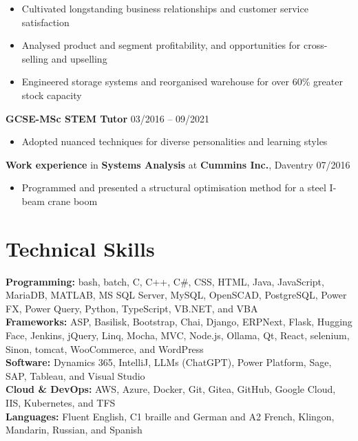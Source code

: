 \documentclass[10pt,a4paper]{article}
\begin{document}
\begin{itemize}[noitemsep]
   \item Cultivated longstanding business relationships and customer service satisfaction
   \item Analysed product and segment profitability, and opportunities for cross-selling and upselling
   \item Engineered storage systems and reorganised warehouse for over 60\% greater stock capacity
\end{itemize}
\textbf{GCSE-MSc STEM Tutor} \hfill 03/2016 -- 09/2021\vspace{-\baselineskip}\medskip
\begin{itemize}[noitemsep]
   \item Adopted nuanced techniques for diverse personalities and learning styles
\end{itemize}
\textbf{Work experience} in \textbf{Systems Analysis} at \textbf{Cummins Inc.}, Daventry \hfill 07/2016\vspace{-\baselineskip}\medskip
\begin{itemize}[noitemsep]
   \item Programmed and presented a structural optimisation method for a steel I-beam crane boom
\end{itemize}

\section*{Technical Skills}\vspace{-\baselineskip}\medskip
\textbf{Programming:} bash, batch, C, C++, C\#, CSS, HTML, Java, JavaScript, MariaDB, MATLAB, MS SQL Server, MySQL, OpenSCAD, PostgreSQL, Power FX, Power Query, Python, TypeScript, VB.NET, and VBA\smallskip\\
\textbf{Frameworks:} ASP, Basilisk, Bootstrap, Chai, Django, ERPNext, Flask, Hugging Face, Jenkins, jQuery, Linq, Mocha, MVC, Node.js, Ollama, Qt, React, selenium, Sinon, tomcat, WooCommerce, and WordPress\smallskip\\
\textbf{Software:} Dynamics 365, IntelliJ, LLMs (ChatGPT), Power Platform, Sage, SAP, Tableau, and Visual Studio\smallskip\\
\textbf{Cloud \& DevOps:} AWS, Azure, Docker, Git, Gitea, GitHub, Google Cloud, IIS, Kubernetes, and TFS\smallskip\\
\textbf{Languages:} Fluent English, C1 braille and German and A2 French, Klingon, Mandarin, Russian, and Spanish
\end{document}
